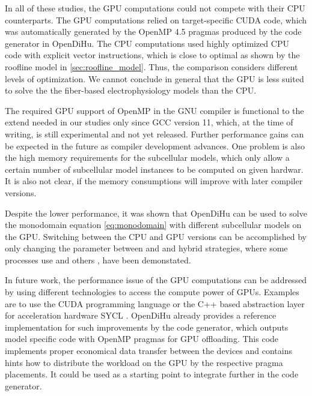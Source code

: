In all of these studies, the GPU computations could not compete with their CPU counterparts. The GPU computations relied on target-specific CUDA code, which was automatically generated by the OpenMP 4.5 pragmas produced by the code generator in OpenDiHu. The CPU computations used highly optimized CPU code with explicit vector instructions, which is close to optimal as shown by the roofline model in \cref{sec:roofline_model}. Thus, the comparison considers different levels of optimization. We cannot conclude in general that the GPU is less suited to solve the the fiber-based electrophysiology models than the CPU.

The required GPU support of OpenMP in the GNU compiler is functional to the extend needed in our studies only since GCC version 11, which, at the time of writing, is still experimental and not yet released. Further performance gains can be expected in the future as compiler development advances. One problem is also the high memory requirements for the subcellular models, which only allow a certain number of subcellular model instances to be computed on given hardwar. It is also not clear, if the memory consumptions will improve with later compiler versions.

Despite the lower performance, it was shown that OpenDiHu can be used to solve the monodomain equation \cref{eq:monodomain} with different subcellular models on the GPU. Switching between the CPU and GPU versions can be accomplished by only changing the  parameter between  and  and hybrid strategies, where some processes use  and others , have been demonstated.

In future work, the performance issue of the GPU computations can be addressed by using different technologies to access the compute power of GPUs.
Examples are to use the CUDA programming language or the C++ based abstraction layer for acceleration hardware SYCL \cite{sycl}. OpenDiHu already provides a reference implementation for such improvements by the code generator, which outputs model specific code with OpenMP pragmas for GPU offloading. This code implements proper economical data transfer between the devices and contains hints how to distribute the workload on the GPU by the respective pragma placements. It could be used as a starting point to integrate further  in the code generator.




